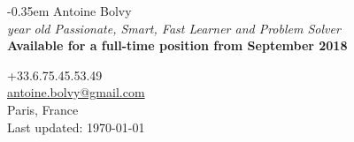 \documentclass[]{resume-openfont}
\begin{document}
\noindent%
\begin{minipage}{.5\textwidth}
\kern-0.35em
{
  \fontsize{28pt}{28pt}
  \selectfont Antoine Bolvy\\
}
\textit{ year old Passionate, Smart, Fast Learner and Problem Solver}\\
\textbf{Available for a full-time position from September 2018}
\vspace{5pt}


\end{minipage}%
\begin{minipage}{.5\textwidth}
\begin{flushright}
\color{headings}+33.6.75.45.53.49\\
\href{mailto:antoine.bolvy@gmail.com}{antoine.bolvy@gmail.com}\\
Paris, France\\
{\color{date}\fontsize{7pt}{12pt}\selectfont{}Last updated: \today}
\end{flushright}
\end{minipage}

\noindent\makebox[\linewidth]{
{\color{headingsrulegray}\rule{\paperwidth}{0.4pt}}}
\vspace{-18pt}

%
%
\end{document}

